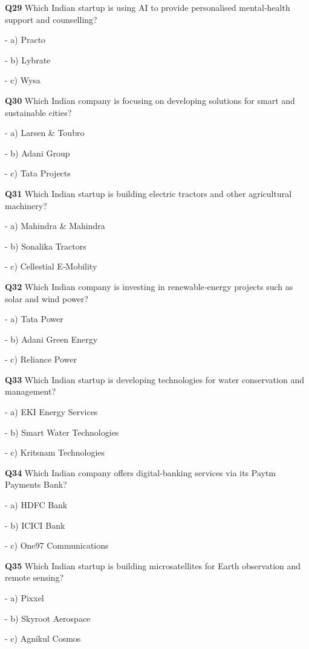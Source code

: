 \textbf{Q29} Which Indian startup is using AI to provide personalised mental‑health support and counselling?\par
\quad - a) Practo\par
\quad - b) Lybrate\par
\quad - c) Wysa\par

\textbf{Q30} Which Indian company is focusing on developing solutions for smart and sustainable cities?\par
\quad - a) Larsen & Toubro\par
\quad - b) Adani Group\par
\quad - c) Tata Projects\par

\textbf{Q31} Which Indian startup is building electric tractors and other agricultural machinery?\par
\quad - a) Mahindra & Mahindra\par
\quad - b) Sonalika Tractors\par
\quad - c) Cellestial E‑Mobility\par

\textbf{Q32} Which Indian company is investing in renewable‑energy projects such as solar and wind power?\par
\quad - a) Tata Power\par
\quad - b) Adani Green Energy\par
\quad - c) Reliance Power\par

\textbf{Q33} Which Indian startup is developing technologies for water conservation and management?\par
\quad - a) EKI Energy Services\par
\quad - b) Smart Water Technologies\par
\quad - c) Kritsnam Technologies\par

\textbf{Q34} Which Indian company offers digital‑banking services via its Paytm Payments Bank?\par
\quad - a) HDFC Bank\par
\quad - b) ICICI Bank\par
\quad - c) One97 Communications\par

\textbf{Q35} Which Indian startup is building microsatellites for Earth observation and remote sensing?\par
\quad - a) Pixxel\par
\quad - b) Skyroot Aerospace\par
\quad - c) Agnikul Cosmos\par

